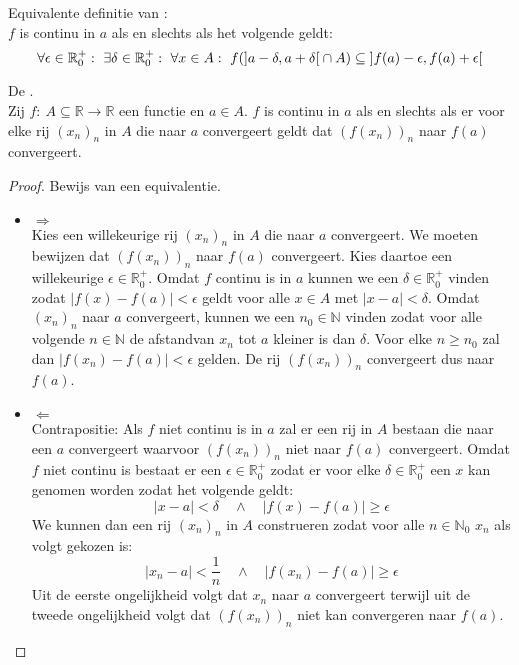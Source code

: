 \documentclass[main.tex]{subfiles}
\begin{document}
\begin{st}
  Equivalente definitie van :\\
  $f$ is continu in $a$ als en slechts als het volgende geldt:
  \[ \forall \epsilon \in \mathbb{R}_{0}^{+}:\ \exists \delta \in \mathbb{R}_{0}^{+}:\ \forall x\in A:\ f(\interval[open]{a-\delta}{a+\delta} \cap A) \subseteq \interval[open]{f(a)-\epsilon}{f(a)+\epsilon} \]
\end{st}


\begin{bpr}
  De .\\
  \label{pr:continu-asa-behoudt-convergentie}
  Zij $f:\ A \subseteq \mathbb{R} \rightarrow \mathbb{R}$ een functie en $a\in A$.
  $f$ is continu in $a$ als en slechts als er voor elke rij $(x_{n})_{n}$ in $A$ die naar $a$ convergeert geldt dat $(f(x_{n}))_{n}$ naar $f(a)$ convergeert.

  \begin{proof}
    Bewijs van een equivalentie.
    \begin{itemize}
    \item $\Rightarrow$\\
      Kies een willekeurige rij $(x_{n})_{n}$ in $A$ die naar $a$ convergeert.
      We moeten bewijzen dat $(f(x_{n}))_{n}$ naar $f(a)$ convergeert.
      Kies daartoe een willekeurige $\epsilon \in \mathbb{R}_{0}^{+}$.
      Omdat $f$ continu is in $a$ kunnen we een $\delta\in \mathbb{R}_{0}^{+}$ vinden zodat $|f(x)-f(a)| < \epsilon$ geldt voor alle $x\in A$ met $|x-a| < \delta$.
      Omdat $(x_{n})_{n}$ naar $a$ convergeert, kunnen we een $n_{0}\in \mathbb{N}$ vinden zodat voor alle volgende $n\in\mathbb{N}$ de afstandvan $x_{n}$ tot $a$ kleiner is dan $\delta$.
      Voor elke $n\ge n_{0}$ zal dan $|f(x_{n})-f(a)| < \epsilon$ gelden.
      De rij $(f(x_{n}))_{n}$ convergeert dus naar $f(a)$.
    \item $\Leftarrow$\\
      Contrapositie: Als $f$ niet continu is in $a$ zal er een rij in $A$ bestaan die naar een $a$ convergeert waarvoor $(f(x_{n}))_{n}$ niet naar $f(a)$ convergeert.
      Omdat $f$ niet continu is bestaat er een $\epsilon \in \mathbb{R}_{0}^{+}$ zodat er voor elke $\delta\in \mathbb{R}_{0}^{+}$ een $x$ kan genomen worden zodat het volgende geldt:
      \[ |x-a| < \delta \quad\wedge\quad |f(x)-f(a)| \ge \epsilon \]
      We kunnen dan een rij $(x_{n})_{n}$ in $A$ construeren zodat voor alle $n\in\mathbb{N}_{0}$ $x_{n}$ als volgt gekozen is:
      \[ |x_{n}-a| < \frac{1}{n} \quad\wedge\quad |f(x_{n})-f(a)| \ge \epsilon \]
      Uit de eerste ongelijkheid volgt dat $x_{n}$ naar $a$ convergeert terwijl uit de tweede ongelijkheid volgt dat $(f(x_{n}))_{n}$ niet kan convergeren naar $f(a)$.
    \end{itemize}
  \end{proof}
\end{bpr}
\end{document}
